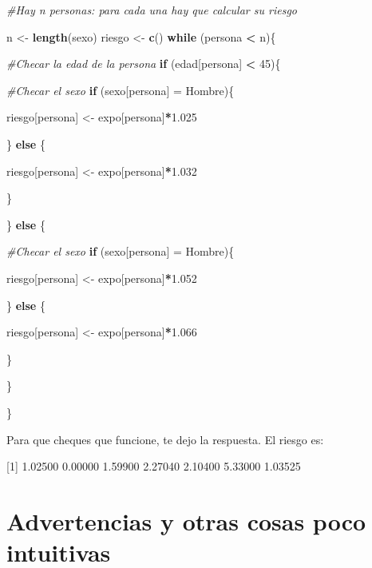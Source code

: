 \documentclass[
]{book}
\newenvironment{Shaded}{\begin{snugshade}}{\end{snugshade}}
\newcommand{\CommentTok}[1]{\textcolor[rgb]{0.56,0.35,0.01}{\textit{#1}}}
\newcommand{\ControlFlowTok}[1]{\textcolor[rgb]{0.13,0.29,0.53}{\textbf{#1}}}
\newcommand{\DecValTok}[1]{\textcolor[rgb]{0.00,0.00,0.81}{#1}}
\newcommand{\FloatTok}[1]{\textcolor[rgb]{0.00,0.00,0.81}{#1}}
\newcommand{\KeywordTok}[1]{\textcolor[rgb]{0.13,0.29,0.53}{\textbf{#1}}}
\newcommand{\NormalTok}[1]{#1}
\newcommand{\OperatorTok}[1]{\textcolor[rgb]{0.81,0.36,0.00}{\textbf{#1}}}
\newcommand{\StringTok}[1]{\textcolor[rgb]{0.31,0.60,0.02}{#1}}
\begin{document}
\begin{Shaded}
\begin{Highlighting}[]
\CommentTok{#Hay n personas: para cada una hay que calcular su riesgo }

\NormalTok{n      <-}\StringTok{ }\KeywordTok{length}\NormalTok{(sexo)}
\NormalTok{riesgo <-}\StringTok{ }\KeywordTok{c}\NormalTok{()}
\ControlFlowTok{while}\NormalTok{ (persona }\OperatorTok{<}\StringTok{ }\NormalTok{n)\{}
  
  \CommentTok{#Checar la edad de la persona}
  \ControlFlowTok{if}\NormalTok{ (edad[persona] }\OperatorTok{<}\StringTok{ }\DecValTok{45}\NormalTok{)\{}
    
    \CommentTok{#Checar el sexo}
    \ControlFlowTok{if}\NormalTok{ (sexo[persona] =}\StringTok{ }\NormalTok{Hombre)\{}
      
\NormalTok{      riesgo[persona] <-}\StringTok{ }\NormalTok{expo[persona]}\OperatorTok{*}\FloatTok{1.025}
      
\NormalTok{    \} }\ControlFlowTok{else}\NormalTok{ \{}
      
\NormalTok{      riesgo[persona] <-}\StringTok{ }\NormalTok{expo[persona]}\OperatorTok{*}\FloatTok{1.032}
      
\NormalTok{    \}}
    
\NormalTok{  \} }\ControlFlowTok{else}\NormalTok{ \{}
    
    \CommentTok{#Checar el sexo}
    \ControlFlowTok{if}\NormalTok{ (sexo[persona] =}\StringTok{ }\NormalTok{Hombre)\{}
      
\NormalTok{      riesgo[persona] <-}\StringTok{ }\NormalTok{expo[persona]}\OperatorTok{*}\FloatTok{1.052}
      
\NormalTok{    \} }\ControlFlowTok{else}\NormalTok{ \{}
      
\NormalTok{      riesgo[persona] <-}\StringTok{ }\NormalTok{expo[persona]}\OperatorTok{*}\FloatTok{1.066}
      
\NormalTok{    \}}
    
\NormalTok{  \}}
  
  
  
\NormalTok{\}}
\end{Highlighting}
\end{Shaded}

Para que cheques que funcione, te dejo la respuesta. El riesgo es:

{[}1{]} 1.02500 0.00000 1.59900 2.27040 2.10400 5.33000 1.03525

\hypertarget{advertencias-y-otras-cosas-poco-intuitivas}{%
\section{Advertencias y otras cosas poco intuitivas}\label{advertencias-y-otras-cosas-poco-intuitivas}}
\end{document}
